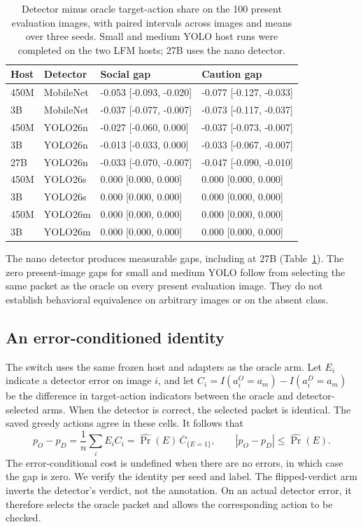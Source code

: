 \documentclass[10pt]{article}
\begin{document}
\begin{table}[htbp]\centering\small
\caption{Detector minus oracle target-action share on the 100 present
evaluation images, with paired intervals across images and means over
three seeds. Small and medium YOLO host runs were completed on the two
LFM hosts; 27B uses the nano detector.}\label{tab:switch}
\begin{tabular}{llll}\toprule
Host & Detector & Social gap & Caution gap\\\midrule
450M & MobileNet & -0.053 [-0.093, -0.020] & -0.077 [-0.127, -0.033] \\
3B & MobileNet & -0.037 [-0.077, -0.007] & -0.073 [-0.117, -0.037] \\
450M & YOLO26n & -0.027 [-0.060, 0.000] & -0.037 [-0.073, -0.007] \\
3B & YOLO26n & -0.013 [-0.033, 0.000] & -0.033 [-0.067, -0.007] \\
27B & YOLO26n & -0.033 [-0.070, -0.007] & -0.047 [-0.090, -0.010] \\
450M & YOLO26s & 0.000 [0.000, 0.000] & 0.000 [0.000, 0.000] \\
3B & YOLO26s & 0.000 [0.000, 0.000] & 0.000 [0.000, 0.000] \\
450M & YOLO26m & 0.000 [0.000, 0.000] & 0.000 [0.000, 0.000] \\
3B & YOLO26m & 0.000 [0.000, 0.000] & 0.000 [0.000, 0.000] \\

\bottomrule\end{tabular}
\end{table}

The nano detector produces measurable gaps, including at 27B
(Table~\ref{tab:switch}). The zero present-image gaps for small and
medium YOLO follow from selecting the same packet as the oracle on
every present evaluation image. They do not establish behavioral
equivalence on arbitrary images or on the absent class.

\subsection{An error-conditioned identity}
The switch uses the same frozen host and adapters as the oracle arm.
Let $E_i$ indicate a detector error on image $i$, and let
$C_i=I(a_i^{O}=a_m)-I(a_i^{D}=a_m)$ be the difference in target-action
indicators between the oracle and detector-selected arms. When the
detector is correct, the selected packet is identical. The saved
greedy actions agree in these cells. It follows that
\begin{equation}
 p_O-p_D = \frac1n\sum_i E_i C_i
          =\widehat{\Pr}(E)\,\overline C_{\{E=1\}},
 \qquad |p_O-p_D|\leq\widehat{\Pr}(E).
\end{equation}
The error-conditional cost is undefined when there are no errors, in
which case the gap is zero. We verify the identity per seed and label.
The flipped-verdict arm inverts the detector's verdict, not the
annotation. On an actual detector error, it therefore selects the
oracle packet and allows the corresponding action to be checked.
\end{document}

